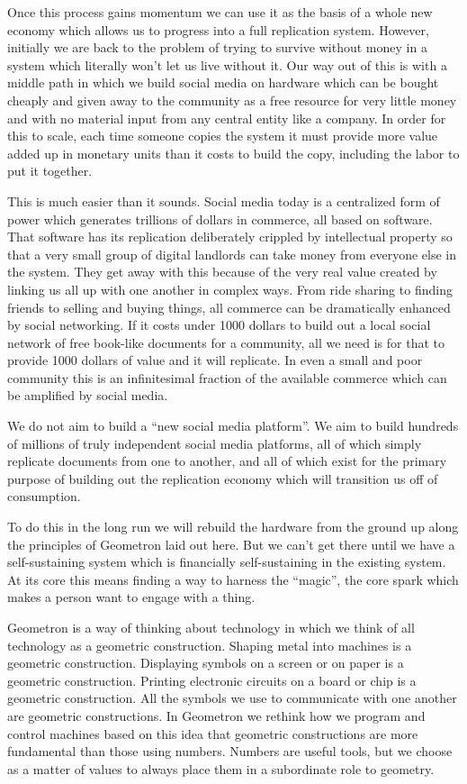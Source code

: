 Once this process gains momentum we can use it as the basis of a whole
new economy which allows us to progress into a full replication system.
However, initially we are back to the problem of trying to survive
without money in a system which literally won't let us live without it.
Our way out of this is with a middle path in which we build social media
on hardware which can be bought cheaply and given away to the community
as a free resource for very little money and with no material input from
any central entity like a company. In order for this to scale, each time
someone copies the system it must provide more value added up in
monetary units than it costs to build the copy, including the labor to
put it together.

This is much easier than it sounds. Social media today is a centralized
form of power which generates trillions of dollars in commerce, all
based on software. That software has its replication deliberately
crippled by intellectual property so that a very small group of digital
landlords can take money from everyone else in the system. They get away
with this because of the very real value created by linking us all up
with one another in complex ways. From ride sharing to finding friends
to selling and buying things, all commerce can be dramatically enhanced
by social networking. If it costs under 1000 dollars to build out a
local social network of free book-like documents for a community, all we
need is for that to provide 1000 dollars of value and it will replicate.
In even a small and poor community this is an infinitesimal fraction of
the available commerce which can be amplified by social media.

We do not aim to build a ``new social media platform''. We aim to build
hundreds of millions of truly independent social media platforms, all of
which simply replicate documents from one to another, and all of which
exist for the primary purpose of building out the replication economy
which will transition us off of consumption.

To do this in the long run we will rebuild the hardware from the ground
up along the principles of Geometron laid out here. But we can't get
there until we have a self-sustaining system which is financially
self-sustaining in the existing system. At its core this means finding a
way to harness the ``magic'', the core spark which makes a person want
to engage with a thing.

Geometron is a way of thinking about technology in which we think of all
technology as a geometric construction. Shaping metal into machines is a
geometric construction. Displaying symbols on a screen or on paper is a
geometric construction. Printing electronic circuits on a board or chip
is a geometric construction. All the symbols we use to communicate with
one another are geometric constructions. In Geometron we rethink how we
program and control machines based on this idea that geometric
constructions are more fundamental than those using numbers. Numbers are
useful tools, but we choose as a matter of values to always place them
in a subordinate role to geometry.

